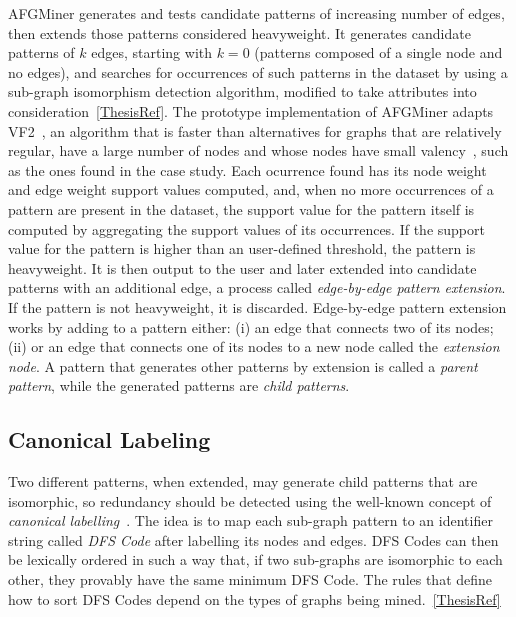 AFGMiner generates and tests candidate patterns of increasing number of edges, then extends those patterns considered heavyweight. It generates candidate patterns of $k$ edges, starting with $k = 0$ (patterns composed of a single node and no edges), and searches for occurrences of such patterns in the dataset by using a sub-graph isomorphism detection algorithm, modified to take attributes into consideration~\ref{ThesisRef}. The prototype implementation of AFGMiner adapts VF2~\cite{Cordella}, an algorithm that is faster than alternatives for graphs that are relatively regular, have a large number of nodes and whose nodes have small valency~\cite{Foggia}, such as the ones found in the case study. Each ocurrence found has its node weight and edge weight support values computed, and, when no more occurrences of a pattern are present in the dataset, the support value for the pattern itself is computed by aggregating the support values of its occurrences. If the support value for the pattern is higher than an user-defined threshold, the pattern is heavyweight. It is then output to the user and later extended into candidate patterns with an additional edge, a process called \emph{edge-by-edge pattern extension}. If the pattern is not heavyweight, it is discarded. Edge-by-edge pattern extension works by adding to a pattern either: (i) an edge that connects two of its nodes; (ii) or an edge that connects one of its nodes to a new node called the \emph{extension node}. A pattern that generates other patterns by extension is called a \emph{parent pattern}, while the generated patterns are \emph{child patterns}.

\subsection{Canonical Labeling}
Two different patterns, when extended, may generate child patterns that are isomorphic, so redundancy should be detected using the well-known concept of \emph{canonical labelling}~\cite{gSpan}. The idea is to map each sub-graph pattern to an identifier string called \emph{DFS Code} after labelling its nodes and edges. DFS Codes can then be lexically ordered in such a way that, if two sub-graphs are isomorphic to each other, they provably have the same minimum DFS Code. The rules that define how to sort DFS Codes depend on the types of graphs being mined.~\ref{ThesisRef}

